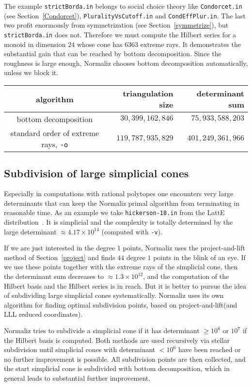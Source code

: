 \documentclass[12pt,a4paper]{scrartcl}
\theoremstyle{definition}
\def\ttt{\texttt}
\begin{document}
The example \verb|strictBorda.in| belongs to social choice theory like \verb|Condorcet.in| (see Section~\ref{Condorcet}), \verb|PluralityVsCutoff.in| and \verb|CondEffPlur.in|. The last two profit enormously from symmetrization (see Section~\ref{symmetrize}), but \verb| strictBorda.in| does not. Therefore we must compute the Hilbert series for a monoid in dimension $24$ whose cone has $6363$ extreme rays. It demonstrates the substantial gain that can be reached by bottom decomposition. Since the roughness is large enough, Normaliz chooses bottom decomposition automatically, unless we block it.
\begin{center}
	\begin{tabular}{|c|r|r|}\hline
		algorithm	& triangulation size& determinant sum \\ \hline
		bottom decomposition& $30,399,162,846$ & $75,933,588,203$ \\ \hline
		standard order of extreme rays, \ttt{-o} & $119,787,935,829$ & $401,249,361,966$ \\ \hline
	\end{tabular}
\end{center}

\subsection{Subdivision of large simplicial cones}\label{subdiv}

Especially in computations with rational polytopes one encounters very large determinants that can keep the Normaliz primal algorithm from terminating in reasonable time. As an example we take \verb|hickerson-18.in| from the LattE distribution~\cite{LatInt}. It is simplicial and the complexity is totally determined by the large determinant $\approx 4.17\times 10^{14}$ (computed with \verb|-v|).

If we are just interested in the degree $1$ points, Normaliz uses the project-and-lift method of Section~\ref{project} and finds $44$ degree $1$ points in the blink of an eye. If we use these points together with the extreme rays of the simplicial cone, then the determinant sum decreases to $\approx 1.3\times 10^{12}$, and the computation of the Hilbert basis and the Hilbert series is in reach. But it is better to pursue the idea of subdividing large simplicial cones systematically. Normaliz
uses its own algorithm for finding optimal subdivision points, based on project-and-lift(and LLL reduced coordinates).

Normaliz tries to subdivide a simplicial cone if it has determinant $\ge 10^8$ or $10^7$ if the Hilbert basis is computed. Both methods are used recursively via stellar subdivision until simplicial cones with determinant $< 10^6$ have been reached or no further improvement is possible. All subdivision points are then collected, and the start simplicial cone is subdivided with bottom decomposition, which in general leads to substantial further improvement.
\end{document}
